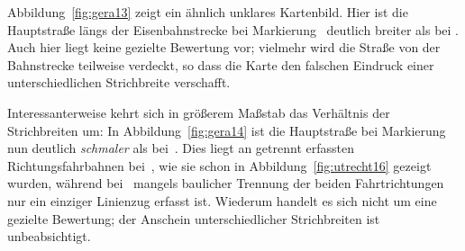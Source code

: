 \documentclass[../main/thesis.tex]{subfiles}
\begin{document}
Abbildung~\ref{fig:gera13} zeigt ein ähnlich unklares Kartenbild.
Hier ist die Hauptstraße längs der Eisenbahnstrecke bei Markierung~ deutlich breiter als bei .
Auch hier liegt keine gezielte Bewertung vor; vielmehr wird die Straße von der Bahnstrecke teilweise verdeckt, so dass die Karte den falschen Eindruck einer unterschiedlichen Strichbreite verschafft.


Interessanterweise kehrt sich in größerem Maßstab das Verhältnis der Strichbreiten um:
In Abbildung~\ref{fig:gera14} ist die Hauptstraße bei Markierung~ nun deutlich \emph{schmaler} als bei~.
Dies liegt an getrennt erfassten Richtungsfahrbahnen bei~, wie sie schon in Abbildung~\ref{fig:utrecht16} gezeigt wurden, während bei~ mangels baulicher Trennung der beiden Fahrtrichtungen nur ein einziger Linienzug erfasst ist.
Wiederum handelt es sich nicht um eine gezielte Bewertung; der Anschein unterschiedlicher Strichbreiten ist unbeabsichtigt.

\end{document}
